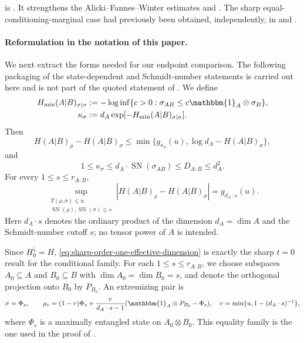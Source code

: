 \documentclass[11pt]{article}
\theoremstyle{remark}
\newcommand{\1}{\mathbbm{1}}
\begin{document}
 is
\cite[Theorem~1.1 and Proposition~2.1]
{berta2026sharpconditional}.  It strengthens the
Alicki--Fannes--Winter estimates
\cite[Eq.~(1)]{alicki2004continuity} and
\cite[Lemma~2]{winter2016tight}.  The sharp
equal-conditioning-marginal case had previously been obtained,
independently, in
\cite[Theorem~5]{berta2025integral} and
\cite[Theorem~5 and Remark~4]{audenaert2025fundamental}.

\paragraph{Reformulation in the notation of this paper.}
We next extract the forms needed for our endpoint comparison.  The
following packaging of the state-dependent and Schmidt-number
statements is carried out here and is not part of the quoted statement
of .  We define
\begin{align}
 H_{\min}(A|B)_{\sigma|\sigma}
 &:=-\log\inf\{c>0:\sigma_{AB}
       \leq c\1_A\otimes\sigma_B\},\notag\\
 \kappa_\sigma
 &:=d_A\exp[-H_{\min}(A|B)_{\sigma|\sigma}].
 \label{eq:kappa-anchor-continuity}
\end{align}
Then
\begin{equation}
 H(A|B)_\rho-H(A|B)_\sigma
 \leq\min\{g_{\kappa_\sigma}(u),
             \log d_A-H(A|B)_\sigma\},
 \label{eq:anchor-refined-order-one-bound}
\end{equation}
and
\begin{equation}
 1\leq\kappa_\sigma
 \leq d_A\cdot\operatorname{SN}(\sigma_{AB})
 \leq D_{A:B}\leq d_A^2.
 \label{eq:kappa-Schmidt-hierarchy}
\end{equation}
For every $1\leq s\leq r_{A:B}$,
\begin{equation}
 \sup_{\substack{T(\rho,\sigma)\leq u\\
       \operatorname{SN}(\rho),\operatorname{SN}(\sigma)\leq s}}
 \left|H(A|B)_\rho-H(A|B)_\sigma\right|
 =g_{d_A\cdot s}(u).
 \label{eq:exact-Schmidt-number-modulus}
\end{equation}
Here $d_A\cdot s$ denotes the ordinary product of the dimension
$d_A=\dim A$ and the Schmidt-number cutoff $s$; no tensor power of
$A$ is intended.

Since $H_0^\downarrow=H$,
\eqref{eq:sharp-order-one-effective-dimension} is exactly the sharp
$t=0$ result for the conditional family.  For
each $1\leq s\leq r_{A:B}$, we choose subspaces
$A_0\subseteq A$ and $B_0\subseteq B$ with
$\dim A_0=\dim B_0=s$, and denote the orthogonal projection
onto $B_0$ by $P_{B_0}$.  An extremizing pair is
\begin{equation}
 \sigma=\Phi_s,
 \qquad
 \rho_v=(1-v)\Phi_s+\frac{v}{d_A\cdot s-1}
 (\1_A\otimes P_{B_0}-\Phi_s),
 \quad v=\min\{u,1-(d_A\cdot s)^{-1}\},
 \label{eq:order-one-isotropic-extremizer}
\end{equation}
where $\Phi_s$ is a maximally entangled state on $A_0\otimes B_0$.
This equality family is the one used in the proof of
\cite[Proposition~2.1]{berta2026sharpconditional}.
\end{document}

